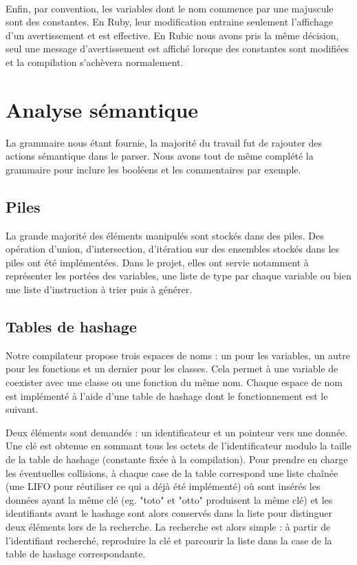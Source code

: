 \documentclass[12pt]{article}
\begin{document}
\paragraph{}
Enfin, par convention, les variables dont le nom commence par une majuscule sont des constantes. En Ruby, leur modification entraine seulement l'affichage d'un avertissement et est effective. En Rubic nous avons pris la même décision, seul une message d'avertissement est affiché lorsque des constantes sont modifiées et la compilation s'achèvera normalement.


\section{Analyse sémantique}

La grammaire nous étant fournie, la majorité du travail fut de rajouter des
actions sémantique dans le parser. Nous avons tout de même complété la
grammaire pour inclure les booléens et les commentaires par exemple.

\subsection{Piles}

La grande majorité des éléments manipulés sont stockés dans des piles. Des opération d'union, d'intersection, d'itération sur des ensembles stockés dans les piles ont été implémentées. Dans le projet, elles ont servie notamment à représenter les portées des variables, une liste de type par chaque variable ou bien une liste d'instruction à trier puis à générer.


\subsection{Tables de hashage}

Notre compilateur propose trois espaces de noms : un pour les
variables, un autre pour les fonctions et un dernier pour les classes. Cela
permet à une variable de coexister avec une classe ou une fonction du même
nom. Chaque espace de nom est implémenté à l'aide d'une table de hashage dont
le fonctionnement est le suivant.

Deux éléments sont demandés : un identificateur et un pointeur vers une donnée.
Une clé est obtenue en sommant tous les octets de l'identificateur modulo la
taille de la table de hashage (constante fixée à la compilation). Pour prendre
en charge les éventuelles collisions, à chaque case de la table correspond une
liste chaînée (une LIFO pour réutiliser ce qui a déjà été implémenté) où sont
insérés les données ayant la même clé (eg. "toto" et "otto" produisent la même
clé) et les identifiants avant le hashage sont alors conservés dans la liste
pour distinguer deux éléments lors de la recherche. La recherche est alors
simple : à partir de l'identifiant recherché, reproduire la clé et parcourir
la liste dans la case de la table de hashage correspondante.
\end{document}
